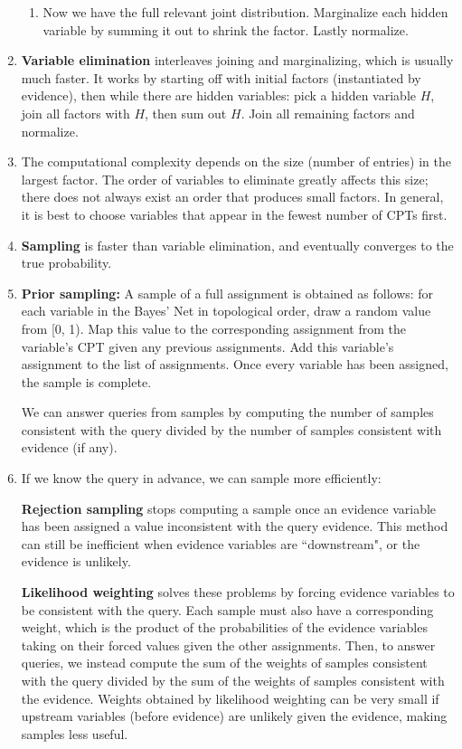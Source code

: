 \documentclass[10pt]{article}
\begin{document}
\begin{multicols}{2}
\begin{addmargin}[0.8em]{0.5em}
\begin{enumerate}[label=(\alph*)]
\begin{enumerate}[label=\roman*.]
            \item Now we have the full relevant joint distribution. Marginalize each hidden variable by summing it out to shrink the factor. Lastly normalize.
        \end{enumerate}
        \item \textbf{Variable elimination} interleaves joining and marginalizing, which is usually much faster. It works by starting off with initial factors (instantiated by evidence), then while there are hidden variables: pick a hidden variable $H$, join all factors with $H$, then sum out $H$. Join all remaining factors and normalize.
        \item The computational complexity depends on the size (number of entries) in the largest factor. The order of variables to eliminate greatly affects this size; there does not always exist an order that produces small factors. In general, it is best to choose variables that appear in the fewest number of CPTs first.
        \item \textbf{Sampling} is faster than variable elimination, and eventually converges to the true probability.

        \item \textbf{Prior sampling:} A sample of a full assignment is obtained as follows: for each variable in the Bayes' Net in topological order, draw a random value from [0, 1). Map this value to the corresponding assignment from the variable's CPT given any previous assignments. Add this variable's assignment to the list of assignments. Once every variable has been assigned, the sample is complete.

        We can answer queries from samples by computing the number of samples consistent with the query divided by the number of samples consistent with evidence (if any).
        
        \item
        If we know the query in advance, we can sample more efficiently:
        
        \textbf{Rejection sampling} stops computing a sample once an evidence variable has been assigned a value inconsistent with the query evidence. This method can still be inefficient when evidence variables are ``downstream", or the evidence is unlikely.
        
        \textbf{Likelihood weighting} solves these problems by forcing evidence variables to be consistent with the query. Each sample must also have a corresponding weight, which is the product of the probabilities of the evidence variables taking on their forced values given the other assignments. Then, to answer queries, we instead compute the sum of the weights of samples consistent with the query divided by the sum of the weights of samples consistent with the evidence. Weights obtained by likelihood weighting can be very small if upstream variables (before evidence) are unlikely given the evidence, making samples less useful. 


\end{enumerate}
\end{addmargin}
\end{multicols}
\end{document}
